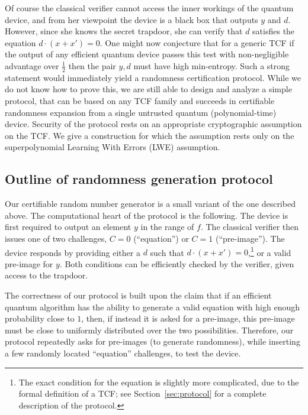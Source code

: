 \documentclass[11pt]{article}
\theoremstyle{remark}
\theoremstyle{definition}
\newcommand{\ket}[1]{|#1\rangle}
\begin{document}

Of course the classical verifier cannot access the inner workings of the quantum device, and from her viewpoint the device is a black box that outputs $y$ and $d$. However, since she knows the secret trapdoor, she can verify that $d$ satisfies the equation  $d\cdot(x + x') = 0$. 
One might now conjecture that for a generic TCF if the output of any efficient quantum device passes this test with non-negligible advantage over $\frac{1}{2}$ then the pair $y,d$ must have high min-entropy. Such a strong statement would immediately yield a randomness certification protocol. 
While we do not know how to prove this, we are still able to design and analyze a simple protocol, that can be based on any TCF family and succeeds in certifiable randomness expansion from a single untrusted quantum (polynomial-time) device. Security of the protocol rests on an appropriate cryptographic assumption on the TCF. We give a construction for which the assumption rests only on the superpolynomial Learning With Errors (LWE) assumption. 

\subsection{Outline of randomness generation protocol}

Our certifiable random number generator is a small variant of the one described above. 
The computational heart of the protocol is the following. The device is first required to output an element $y$ in the range of $f$. The classical verifier then issues one of 
two challenges,  $C=0$ (``equation'') or $C=1$ (``pre-image''). The device responds by providing either a $d$ such that $d\cdot(x + x') = 0$,\footnote{The exact condition for the equation is slightly more complicated, due to the formal definition of a TCF; see Section~\ref{sec:protocol} for a complete description of the protocol.} or a valid pre-image for $y$. Both conditions can be efficiently checked by the verifier, given access to the trapdoor. 

The correctness of our protocol is built upon the claim that if an efficient quantum algorithm has the ability to generate a valid equation with high enough probability close to $1$, then, if instead it is asked for a pre-image, this pre-image must be close to uniformly distributed over the two possibilities. Therefore, our protocol repeatedly asks for pre-images (to generate randomness), while inserting a few randomly located ``equation'' challenges, to test the device. 
\end{document}
